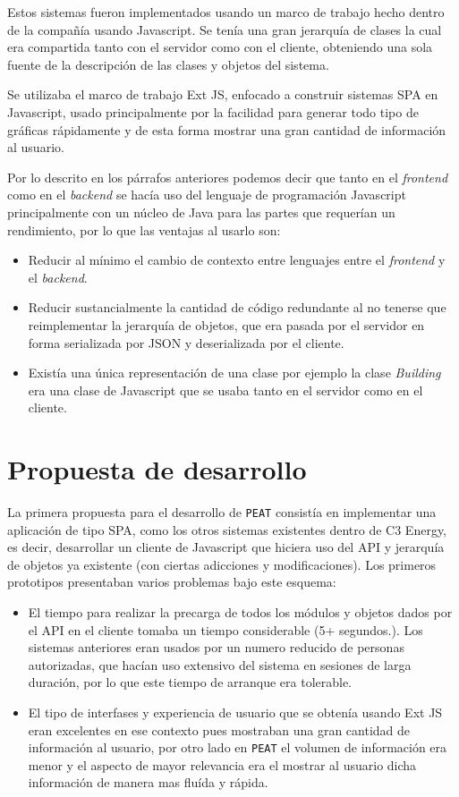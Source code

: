 Estos sistemas fueron implementados usando un marco de trabajo hecho dentro
de la compañía usando Javascript. Se tenía una gran jerarquía de clases
la cual era compartida tanto con el servidor como con el cliente, obteniendo una
sola fuente de la descripción de las clases y objetos del sistema.

Se utilizaba el marco de trabajo Ext JS, enfocado a construir sistemas SPA
en Javascript, usado principalmente por la facilidad para generar
todo tipo de gráficas rápidamente y de esta forma mostrar una gran cantidad
de información al usuario.

Por lo descrito en los párrafos anteriores podemos decir que tanto en el
\textit{frontend} como en el \textit{backend} se hacía uso del lenguaje
de programación Javascript principalmente con un núcleo de Java para las partes
que requerían un rendimiento, por lo que las ventajas al usarlo son:

\begin{itemize}
\item Reducir al mínimo el cambio de contexto entre lenguajes entre
  el \textit{frontend} y el \textit{backend}.
\item Reducir sustancialmente la cantidad de código redundante al no
  tenerse que reimplementar la jerarquía de objetos, que era pasada
  por el servidor en forma serializada por JSON y deserializada por el
  cliente.
\item Existía una única representación de una clase por ejemplo la
  clase \textit{Building} era una clase de Javascript que se usaba
  tanto en el servidor como en el cliente.
\end{itemize}

\section{Propuesta de desarrollo}
La primera propuesta para el desarrollo de \texttt{PEAT} consistía
en implementar una aplicación de tipo SPA, como los otros sistemas
existentes dentro de C3 Energy, es decir, desarrollar un cliente
de Javascript que hiciera uso del API y jerarquía de objetos
ya existente (con ciertas adicciones y modificaciones).
Los primeros prototipos presentaban varios problemas bajo este esquema:

\begin{itemize}
\item El tiempo para realizar la precarga de todos los módulos y
  objetos dados por el API en el cliente tomaba un tiempo
  considerable (5+ segundos.). Los sistemas anteriores eran usados
  por un numero reducido de personas autorizadas, que hacían uso
  extensivo del sistema en sesiones de larga duración, por lo
  que este tiempo de arranque era tolerable.
\item El tipo de interfases y experiencia de usuario que se obtenía
  usando Ext JS eran excelentes en ese contexto pues mostraban una gran
  cantidad de información al usuario, por otro lado en \texttt{PEAT}
  el volumen de información era menor y el aspecto de mayor relevancia
  era el mostrar al usuario dicha información de manera mas fluída y rápida.
\end{itemize}


